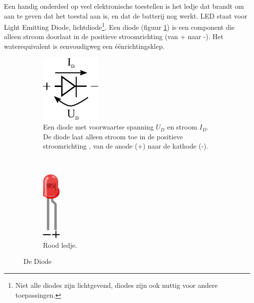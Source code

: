 \documentclass{article}
\begin{document}
			Een handig onderdeel op veel elektronische toestellen is het ledje dat brandt om aan te geven dat het toestal aan is, en dat de batterij nog werkt. LED staat voor Light Emitting Diode, lichtdiode\footnote{Niet alle diodes zijn lichtgevend, diodes zijn ook nuttig voor andere toepassingen.}. Een diode (figuur \ref{fig:diode}) is een component die alleen stroom doorlaat in de positieve stroomrichting (van + naar -). Het waterequivalent is eenvoudigweg een \'e\'enrichtingsklep.
			\begin{figure}[htbp]
			\centering
				\begin{subfigure}[b]{0.45\linewidth}
					\centering
					\includegraphics{diode}
					\caption{Een diode met voorwaartse spanning $U_D$ en stroom $I_D$. De diode laat alleen stroom toe in de  positieve stroomrichting , van de anode (+) naar de kathode (-).}
					\label{fig:diode}
				\end{subfigure}
				~
				\begin{subfigure}[b]{0.45\linewidth}
					\centering
				\includegraphics[width=0.1\textwidth]{led}
				\caption{Rood ledje.}
				\label{fig:led}
				\end{subfigure}
				\caption{De Diode}
			\end{figure}
\end{document}
